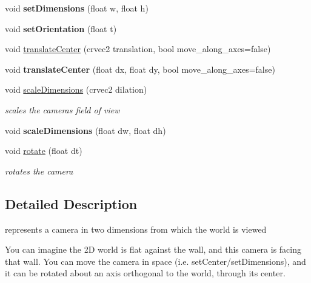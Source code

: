 \begin{DoxyCompactItemize}
void {\bfseries set\+Dimensions} (float w, float h)
\item 
\mbox{\label{classnta_1_1Camera2D_ae1b3a5ef4259881936317fc0c18c4a13}} 
void {\bfseries set\+Orientation} (float t)
\item 
void \hyperlink{classnta_1_1Camera2D_a711b1b64b4e0bbca5c598ac15609f498}{translate\+Center} (crvec2 translation, bool move\+\_\+along\+\_\+axes=false)
\item 
\mbox{\label{classnta_1_1Camera2D_a95ecd50d9ec6031b4d015f33d442d096}} 
void {\bfseries translate\+Center} (float dx, float dy, bool move\+\_\+along\+\_\+axes=false)
\item 
\mbox{\label{classnta_1_1Camera2D_aa89b58a2a5ca0c3df56d07e2722afcd6}} 
void \hyperlink{classnta_1_1Camera2D_aa89b58a2a5ca0c3df56d07e2722afcd6}{scale\+Dimensions} (crvec2 dilation)
\begin{DoxyCompactList}\small\item\em scales the camera\textquotesingle{}s field of view \end{DoxyCompactList}\item 
\mbox{\label{classnta_1_1Camera2D_ae5e80a376fe4b6457e712c6bc94b8584}} 
void {\bfseries scale\+Dimensions} (float dw, float dh)
\item 
\mbox{\label{classnta_1_1Camera2D_a4529f2111c2621764c42365df5a504e0}} 
void \hyperlink{classnta_1_1Camera2D_a4529f2111c2621764c42365df5a504e0}{rotate} (float dt)
\begin{DoxyCompactList}\small\item\em rotates the camera \end{DoxyCompactList}\end{DoxyCompactItemize}


\subsection{Detailed Description}
represents a camera in two dimensions from which the world is viewed

You can imagine the 2D world is flat against the wall, and this camera is facing that wall. You can move the camera in space (i.\+e. set\+Center/set\+Dimensions), and it can be rotated about an axis orthogonal to the world, through its center. 

